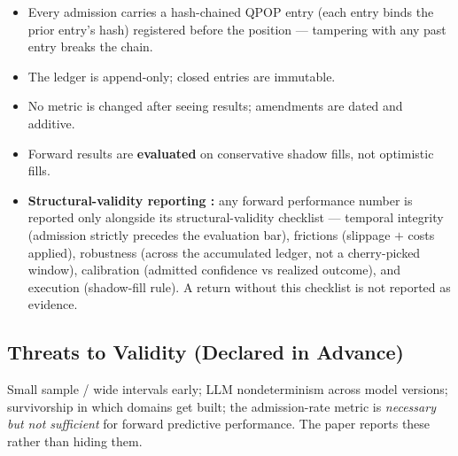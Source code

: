 \documentclass[11pt]{article}
\begin{document}
\begin{itemize}
  \item Every admission carries a hash-chained QPOP entry (each entry binds the prior entry's
    hash) registered before the position --- tampering with any past entry breaks the chain.
  \item The ledger is append-only; closed entries are immutable.
  \item No metric is changed after seeing results; amendments are dated and additive.
  \item Forward results are \textbf{evaluated} on conservative shadow fills, not optimistic fills.
  \item \textbf{Structural-validity reporting \citep{ye2026alphaillusion}:} any forward
    performance number is reported only alongside its structural-validity checklist ---
    temporal integrity (admission strictly precedes the evaluation bar), frictions (slippage
    $+$ costs applied), robustness (across the accumulated ledger, not a cherry-picked window),
    calibration (admitted confidence vs realized outcome), and execution (shadow-fill rule).
    A return without this checklist is not reported as evidence.
\end{itemize}

\subsection*{Threats to Validity (Declared in Advance)}

Small sample / wide intervals early; LLM nondeterminism across model versions; survivorship in
which domains get built; the admission-rate metric is \emph{necessary but not sufficient} for
forward predictive performance. The paper reports these rather than hiding them.
\end{document}
